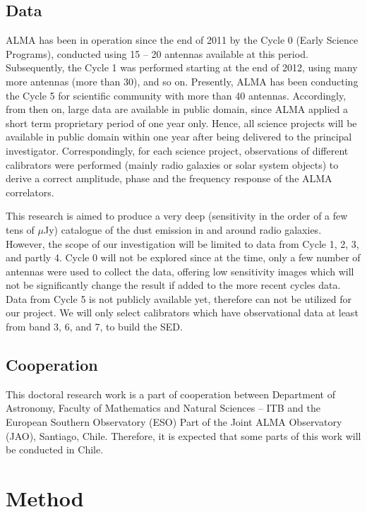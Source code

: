 \subsection*{Data}
ALMA has been in operation since the end of 2011 by the Cycle 0 (Early Science Programs), conducted using 15 -- 20 antennas available at this period. Subsequently, the Cycle 1 was performed starting at the end of 2012, using many more antennas (more than 30), and so on. Presently, ALMA has been conducting the Cycle 5 for scientific community with more than 40 antennas. Accordingly, from then on, large data are available in public domain, since ALMA applied a short term proprietary period of one year only. Hence, all science projects will be available in public domain within one year after being delivered to the principal investigator. Correspondingly, for each science project, observations of different calibrators were performed (mainly radio galaxies or solar system objects) to derive a correct amplitude, phase and the frequency response of the ALMA correlators.

This research is aimed to produce a very deep (sensitivity in the order of a few tens of $\mu$Jy) catalogue of the dust emission in and around radio galaxies. However, the scope of our investigation will be limited to data from Cycle 1, 2, 3, and partly 4. Cycle 0 will not be explored since at the time, only a few number of antennas were used to collect the data, offering low sensitivity images which will not be significantly change the result if added to the more recent cycles data. Data from Cycle 5 is not publicly available yet, therefore can not be utilized for our project. We will  only select calibrators which have observational data at least from band 3, 6, and 7, to build the SED.

\subsection*{Cooperation}
This doctoral research work is a part of cooperation between Department of Astronomy, Faculty of Mathematics and Natural Sciences -- ITB and the European Southern Observatory (ESO) Part of the Joint ALMA Observatory (JAO), Santiago, Chile. Therefore, it is expected that some parts of this work will be conducted in Chile. 


\section{Method}

